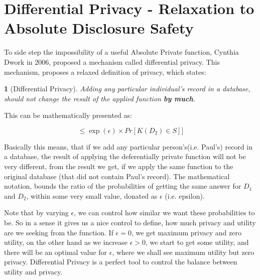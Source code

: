 \documentclass[12pt]{report}
\theoremstyle{named}
\newtheorem*{namedtheorem}{}
\begin{document}
\section{Differential Privacy - Relaxation to Absolute Disclosure Safety}
\label{sec:RelaxationToAbsolute}
To side step the impossibility of a useful Absolute Private function,  Cynthia Dwork in 2006, proposed a mechanism called differential privacy.  This mechanism, proposes a relaxed definition of privacy, which states:

\begin{namedtheorem}[Differential Privacy\cite{Dwork:2006:DP:2097282.2097284}]
Adding any particular individual's record in a database, should not change the result of the applied function \textbf{by much}.
\end{namedtheorem}

This can be mathematically presented as:

\begin{equation}
[Pr[\mathit{K}(D_{1})\in S] \leq \exp (\epsilon ) \times Pr[\mathit{K}(D_{2})\in S]] \end{equation}


Basically this means, that if we add any particular person's(i.e. Paul's) record in a database, the result of applying the deferentially private function will not be very different, from the result we get, if we apply the same function to the original database (that did not contain Paul's record). The mathematical notation, bounds the ratio of the probabilities of getting the same answer for $D_{1}$ and $D_2$, within some very small value, donated as $\epsilon$ (i.e. epsilon).

Note that by varying $\epsilon$, we can control how similar we want these probabilities to be. So in a sense it gives us a nice control to define, how much privacy and utility are we seeking from the function. If $\epsilon = 0$, we get maximum privacy and zero utility, on the other hand as we increase $\epsilon > 0$, we start to get some utility, and there will be an optimal value for $\epsilon$, where we shall see maximum utility but zero privacy. Differential Privacy is a perfect tool to control the balance between utility and privacy.
\end{document}

